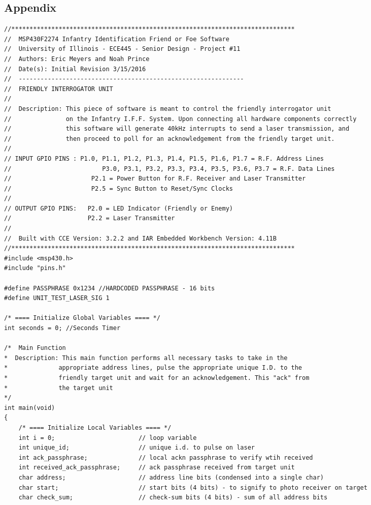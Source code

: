 \documentclass[letterpaper,10pt]{article}
\begin{document}
\begin{spacing}{1.15}
\section*{Appendix}
\begin{lstlisting}
//******************************************************************************
//  MSP430F2274 Infantry Identification Friend or Foe Software 
//  University of Illinois - ECE445 - Senior Design - Project #11
//  Authors: Eric Meyers and Noah Prince
//  Date(s): Initial Revision 3/15/2016
//  --------------------------------------------------------------
//  FRIENDLY INTERROGATOR UNIT
//  
//  Description: This piece of software is meant to control the friendly interrogator unit
//               on the Infantry I.F.F. System. Upon connecting all hardware components correctly
//               this software will generate 40kHz interrupts to send a laser transmission, and 
//               then proceed to poll for an acknowledgement from the friendly target unit. 
//
// INPUT GPIO PINS : P1.0, P1.1, P1.2, P1.3, P1.4, P1.5, P1.6, P1.7 = R.F. Address Lines
//                  	   P3.0, P3.1, P3.2, P3.3, P3.4, P3.5, P3.6, P3.7 = R.F. Data Lines
//                      P2.1 = Power Button for R.F. Receiver and Laser Transmitter
//                 		P2.5 = Sync Button to Reset/Sync Clocks
//      
// OUTPUT GPIO PINS:   P2.0 = LED Indicator (Friendly or Enemy)
//                     P2.2 = Laser Transmitter
//
//  Built with CCE Version: 3.2.2 and IAR Embedded Workbench Version: 4.11B
//******************************************************************************
#include <msp430.h>
#include "pins.h"

#define PASSPHRASE 0x1234 //HARDCODED PASSPHRASE - 16 bits
#define UNIT_TEST_LASER_SIG 1

/* ==== Initialize Global Variables ==== */
int seconds = 0; //Seconds Timer 

/*  Main Function
*  Description: This main function performs all necessary tasks to take in the 
*              appropriate address lines, pulse the appropriate unique I.D. to the
*              friendly target unit and wait for an acknowledgement. This "ack" from
*              the target unit
*/
int main(void)
{
	/* ==== Initialize Local Variables ==== */
	int i = 0;                       // loop variable
	int unique_id;                   // unique i.d. to pulse on laser
	int ack_passphrase;              // local ackn passphrase to verify wtih received
	int received_ack_passphrase;     // ack passphrase received from target unit
	char address;                    // address line bits (condensed into a single char)
	char start;                      // start bits (4 bits) - to signify to photo receiver on target
	char check_sum;                  // check-sum bits (4 bits) - sum of all address bits
	

\end{lstlisting}
\end{spacing}
\end{document}
